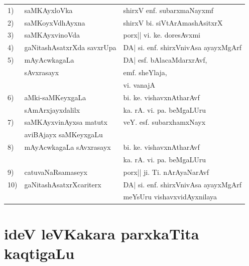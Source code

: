 \medskip
\begin{tabular}{>{\rm }ll@{\hspace{0.9cm}}l}
1) & saMKAyxloVka      & shirxV enf. subarxmaNayxmf\\[0.2cm]
2) & saMKoyxVdhAyxna    & shirxV bi. siVtArAmashAsitxrX\\[0.2cm]
3) & saMKAyxvinoVda    & porx|| vi. ke. doresAvxmi \\[0.2cm]
4) & gaNitashAsatxrXda savxrUpa &  DA| si. enf. shirxVnivAsa ayayxMgArf\\[0.2cm]
5) & mAyAcwkagaLa  & DA| esf. bAlacaMdarxrAvf,\\   
   &  sAvxrasayx   & \qquad emf. sheYlaja,\\
   &               & \qquad vi. vanajA\\[0.2cm]
6) & aMki-saMKeyxgaLa  & bi. ke. vishavxnAtharAvf \\ 
   & sAmArxjayxdalilx  & ka. rA. vi. pa. beMgaLUru\\[0.2cm]
7) & saMKAyxvinAyxsa matutx & veY. esf. subarxhamxNayx\\
   & aviBAjayx saMKeyxgaLu   &                          \\[0.2cm]
8) & mAyAcwkagaLa sAvxrasayx & bi. ke. vishavxnAtharAvf\\
   &                         & ka. rA. vi. pa. beMgaLUru\\[0.2cm]
9) & catuvaNaRsamaseyx       & porx|| ji. Ti. nArAyaNarAvf\\[0.2cm]
10)&gaNitashAsatxrXcariterx  & DA| si. enf. shirxVnivAsa ayayxMgArf\\
   &                         & meYsUru vishavxvidAyxnilaya      
\end{tabular}


\vfill
\section*{ideV leVKakara parxkaTita kaqtigaLu}


